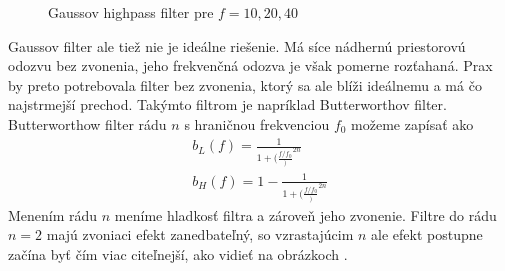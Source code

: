 \begin{figure}[htp]
    \def\path{obrazky/informatika/digitalne_filtre}
    \centering
    \caption{Gaussov highpass filter pre $f=10,20,40$}
    \label{fig:gauss_highpass_filter}
\end{figure}

Gaussov filter ale tiež nie je ideálne riešenie. Má síce nádhernú
priestorovú odozvu bez zvonenia, jeho frekvenčná odozva je však
pomerne rozťahaná. Prax by preto potrebovala filter bez
zvonenia, ktorý sa ale blíži ideálnemu a má čo najstrmejší prechod.
Takýmto filtrom je napríklad Butterworthov filter.
Butterworthow filter rádu $n$ s hraničnou frekvenciou $f_0$
možeme zapísať ako
\begin{eqnarray}
b_L(f) =  \frac{1}{1 + (\frac{f/f_0})^{2n}} \\
b_H(f) = 1- \frac{1}{1 + (\frac{f/f_0})^{2n}}
\end{eqnarray}
Menením rádu $n$ meníme hladkosť filtra a zároveň jeho zvonenie.
Filtre do rádu $n=2$ majú zvoniaci efekt zanedbateľný, so vzrastajúcim
$n$ ale efekt postupne začína byť čím viac citeľnejší, ako vidieť na
obrázkoch .

